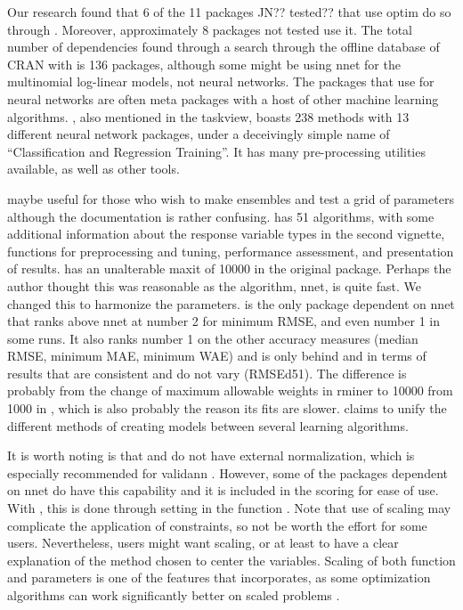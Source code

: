 Our research found that 6 of the 11 packages JN?? tested?? that use
optim do so through . Moreover, approximately 8 packages
not tested use it. The total number of  dependencies found
through a search through the offline database of CRAN with
 is 136 packages, although some might be using nnet
for the multinomial log-linear models, not neural networks. The packages
that use  for neural networks are often meta packages with
a host of other machine learning algorithms. 
\citep{R-caret}, also mentioned in the taskview, boasts 238 methods with
13 different neural network packages, under a deceivingly simple name of
``Classification and Regression Training''. It has many pre-processing
utilities available, as well as other tools.

 \citep{R-EnsembleBase} maybe useful for those who
wish to make ensembles and test a grid of parameters although the
documentation is rather confusing. 
\citep{R-MachineShop} has 51 algorithms, with some additional
information about the response variable types in the second vignette,
functions for preprocessing and tuning, performance assessment, and
presentation of results.  \citep{R-radiant.model}
has an unalterable maxit of 10000 in the original package. Perhaps the
author thought this was reasonable as the algorithm, nnet, is quite
fast. We changed this to harmonize the parameters. 
\citep{R-rminer} is the only package dependent on nnet that ranks above
nnet at number 2 for minimum RMSE, and even number 1 in some runs. It
also ranks number 1 on the other accuracy measures (median RMSE, minimum
MAE, minimum WAE) and is only behind  and
 in terms of results that are consistent and do not
vary (RMSEd51). The difference is probably from the change of maximum
allowable weights in rminer to 10000 from 1000 in , which
is also probably the reason its fits are slower. 
\citep{R-traineR} claims to unify the different methods of creating
models between several learning algorithms.

It is worth noting is that  and  do not
have external normalization, which is especially recommended for
validann . However, some of the packages dependent on nnet do have this
capability and it is included in the scoring for ease of use. With
, this is done through setting  in
the function . Note that use of scaling may complicate
the application of constraints, so not be worth the effort for some
users. Nevertheless, users might want scaling, or at least to have a
clear explanation of the method chosen to center the variables. Scaling
of both function and parameters is one of the features that
 \citep{R-optimx} incorporates, as some optimization
algorithms can work significantly better on scaled problems
\citep{Nash-nlpor14}.


